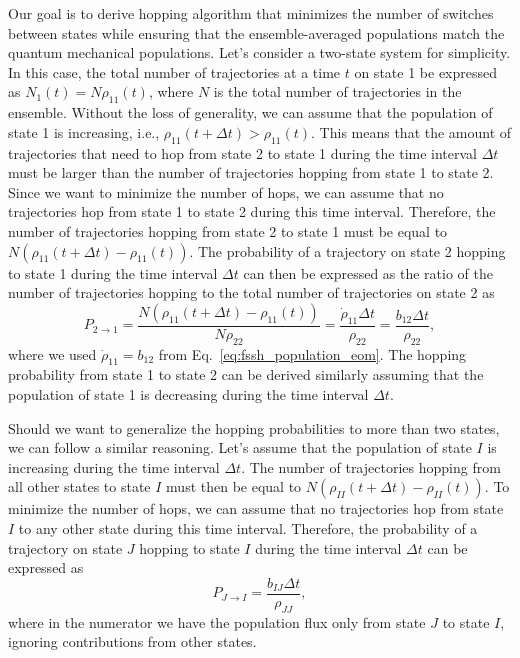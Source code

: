 Our goal is to derive hopping algorithm that minimizes the number of switches between states while ensuring that the ensemble-averaged populations match the quantum mechanical populations. Let's consider a two-state system for simplicity. In this case, the total number of trajectories at a time $t$ on state 1 be expressed as $N_1(t)=N\rho_{11}(t)$, where $N$ is the total number of trajectories in the ensemble. Without the loss of generality, we can assume that the population of state 1 is increasing, i.e., $\rho_{11}(t+\Delta t)>\rho_{11}(t)$. This means that the amount of trajectories that need to hop from state 2 to state 1 during the time interval $\Delta t$ must be larger than the number of trajectories hopping from state 1 to state 2. Since we want to minimize the number of hops, we can assume that no trajectories hop from state 1 to state 2 during this time interval. Therefore, the number of trajectories hopping from state 2 to state 1 must be equal to $N\left(\rho_{11}(t+\Delta t)-\rho_{11}(t)\right)$. The probability of a trajectory on state 2 hopping to state 1 during the time interval $\Delta t$ can then be expressed as the ratio of the number of trajectories hopping to the total number of trajectories on state 2 as
\begin{equation}\label{eq:fssh_hopping_probability_two_state}
P_{2\to 1}=\frac{N\left(\rho_{11}(t+\Delta t)-\rho_{11}(t)\right)}{N\rho_{22}}=\frac{\dot\rho_{11}\Delta t}{\rho_{22}}=\frac{b_{12}\Delta t}{\rho_{22}},
\end{equation}
where we used $\dot\rho_{11}=b_{12}$ from Eq.~\eqref{eq:fssh_population_eom}. The hopping probability from state 1 to state 2 can be derived similarly assuming that the population of state 1 is decreasing during the time interval $\Delta t$.

Should we want to generalize the hopping probabilities to more than two states, we can follow a similar reasoning. Let's assume that the population of state $I$ is increasing during the time interval $\Delta t$. The number of trajectories hopping from all other states to state $I$ must then be equal to $N\left(\rho_{II}(t+\Delta t)-\rho_{II}(t)\right)$. To minimize the number of hops, we can assume that no trajectories hop from state $I$ to any other state during this time interval. Therefore, the probability of a trajectory on state $J$ hopping to state $I$ during the time interval $\Delta t$ can be expressed as
\begin{equation}\label{eq:fssh_hopping_probability_multistate}
P_{J\to I}=\frac{b_{IJ}\Delta t}{\rho_{JJ}},
\end{equation}
where in the numerator we have the population flux only from state $J$ to state $I$, ignoring contributions from other states.
